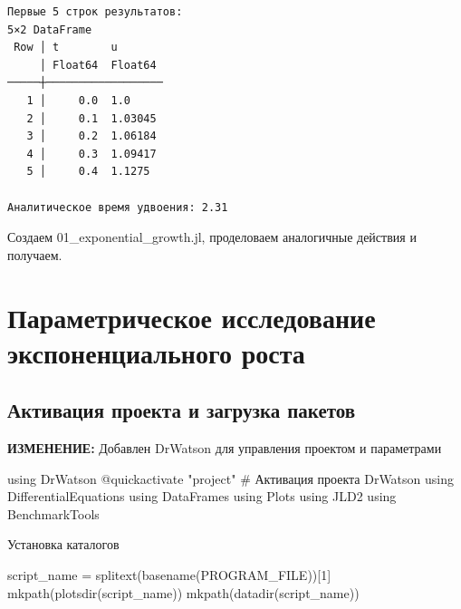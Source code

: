 \documentclass[
  english,
  russian,
  12pt,
  a4paper,
  DIV=11,
  numbers=noendperiod]{scrreprt}
\newenvironment{Shaded}{\begin{snugshade}}{\end{snugshade}}
\newcommand{\BuiltInTok}[1]{\textcolor[rgb]{0.00,0.23,0.31}{#1}}
\newcommand{\CommentTok}[1]{\textcolor[rgb]{0.37,0.37,0.37}{#1}}
\newcommand{\ConstantTok}[1]{\textcolor[rgb]{0.56,0.35,0.01}{#1}}
\newcommand{\FloatTok}[1]{\textcolor[rgb]{0.68,0.00,0.00}{#1}}
\newcommand{\FunctionTok}[1]{\textcolor[rgb]{0.28,0.35,0.67}{#1}}
\newcommand{\ImportTok}[1]{\textcolor[rgb]{0.00,0.46,0.62}{#1}}
\newcommand{\NormalTok}[1]{\textcolor[rgb]{0.00,0.23,0.31}{#1}}
\newcommand{\OperatorTok}[1]{\textcolor[rgb]{0.37,0.37,0.37}{#1}}
\newcommand{\PreprocessorTok}[1]{\textcolor[rgb]{0.68,0.00,0.00}{#1}}
\newcommand{\StringTok}[1]{\textcolor[rgb]{0.13,0.47,0.30}{#1}}
\begin{document}
\begin{verbatim}
Первые 5 строк результатов:
5×2 DataFrame
 Row │ t        u       
     │ Float64  Float64 
─────┼──────────────────
   1 │     0.0  1.0
   2 │     0.1  1.03045
   3 │     0.2  1.06184
   4 │     0.3  1.09417
   5 │     0.4  1.1275

Аналитическое время удвоения: 2.31
\end{verbatim}

Создаем 01\_exponential\_growth.jl, проделоваем аналогичные действия и
получаем.

\chapter{Параметрическое исследование экспоненциального
роста}\label{ux43fux430ux440ux430ux43cux435ux442ux440ux438ux447ux435ux441ux43aux43eux435-ux438ux441ux441ux43bux435ux434ux43eux432ux430ux43dux438ux435-ux44dux43aux441ux43fux43eux43dux435ux43dux446ux438ux430ux43bux44cux43dux43eux433ux43e-ux440ux43eux441ux442ux430}

\section{Активация проекта и загрузка
пакетов}\label{ux430ux43aux442ux438ux432ux430ux446ux438ux44f-ux43fux440ux43eux435ux43aux442ux430-ux438-ux437ux430ux433ux440ux443ux437ux43aux430-ux43fux430ux43aux435ux442ux43eux432}

\textbf{ИЗМЕНЕНИЕ:} Добавлен DrWatson для управления проектом и
параметрами

\begin{Shaded}
\begin{Highlighting}[]
\ImportTok{using} \BuiltInTok{DrWatson}
\PreprocessorTok{@quickactivate} \StringTok{"project"} \CommentTok{\# Активация проекта DrWatson}
\ImportTok{using} \BuiltInTok{DifferentialEquations}
\ImportTok{using} \BuiltInTok{DataFrames}
\ImportTok{using} \BuiltInTok{Plots}
\ImportTok{using} \BuiltInTok{JLD2}
\ImportTok{using} \BuiltInTok{BenchmarkTools}
\end{Highlighting}
\end{Shaded}

Установка каталогов

\begin{Shaded}
\begin{Highlighting}[]
\NormalTok{script\_name }\OperatorTok{=} \FunctionTok{splitext}\NormalTok{(}\FunctionTok{basename}\NormalTok{(}\ConstantTok{PROGRAM\_FILE}\NormalTok{))[}\FloatTok{1}\NormalTok{]}
\FunctionTok{mkpath}\NormalTok{(}\FunctionTok{plotsdir}\NormalTok{(script\_name))}
\FunctionTok{mkpath}\NormalTok{(}\FunctionTok{datadir}\NormalTok{(script\_name))}
\end{Highlighting}
\end{Shaded}
\end{document}
